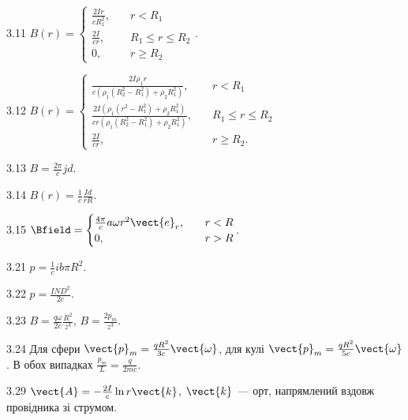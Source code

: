 \begin{Solution}{3.{11}}
	$B(r) = %
		\begin{cases}
			\frac{2Ir}{cR_1^2}, & \quad r < R_1           \\
			\frac{2I}{cr},      & \quad R_1 \le r \le R_2 \\
			0,                  & \quad r \ge R_2
		\end{cases}
	$.
\end{Solution}
\begin{Solution}{3.{12}}
	$B(r) = %
		\begin{cases}
			\frac{2I\rho_1r}{c(\rho_1(R_2^2 - R_1^2) + \rho_2R_1^2)}, & \quad r < R_1           \\
			\frac{2I(\rho_1(r^2 - R_1^2) + \rho_2R_1^2)}{cr(\rho_1(R_2^2 - R_1^2) + \rho_2R_1^2)},      & \quad R_1 \le r \le R_2 \\
			\frac{2I}{cr},                  & \quad r \ge R_2.
		\end{cases}
	$
\end{Solution}
\begin{Solution}{3.{13}}
	$B = \frac{2\pi}{c} jd$.
\end{Solution}
\begin{Solution}{3.{14}}
	$B(r) = \frac{1}{c}\frac{Id}{rR}$.
\end{Solution}
\begin{Solution}{3.{15}}
	$\Bfield = %
		\begin{cases}
			\frac{4\pi}{c} a \omega r^2 \vect{e}_r, & \quad r < R \\
			0,                                      & \quad r > R
		\end{cases}
	$.
\end{Solution}
\begin{Solution}{3.{21}}
		$p = \frac1c ib \pi R^2$.
	
\end{Solution}
\begin{Solution}{3.{22}}
	$p = \frac{IND^2}{2c}$.
\end{Solution}
\begin{Solution}{3.{23}}
	$B = \frac{q\omega}{2c}\frac{R^2}{z^3}$, $B = \frac{2p_m}{z^3}$.
\end{Solution}
\begin{Solution}{3.{24}}
	Для сфери $\vect{p}_m = \frac{qR^2}{3c}\vect{\omega}$,
	для кулі $\vect{p}_m = \frac{qR^2}{5c}\vect{\omega}$.
	В обох випадках $\frac{p_m}{L} = \frac{q}{2mc}$.
\end{Solution}
\begin{Solution}{3.{29}}
	$\vect{A} =-  \frac{2I}{c}\ln r \vect{k}$, $\vect{k}$~--- орт, напрямлений вздовж провідника зі струмом.
\end{Solution}
